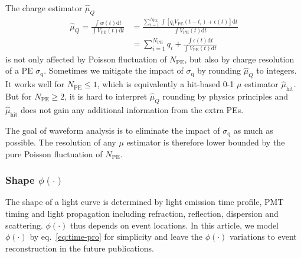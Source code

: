 The charge estimator $\hat{\mu}_Q$
\begin{equation}
  \begin{aligned}
  \label{eq:mu-q}
  \hat{\mu}_Q = \frac{\int w(t) \mathrm{d} t}{\int V_\mathrm{PE}(t) \mathrm{d} t} &= \frac{\sum_{i=1}^{N_\mathrm{PE}} \int \left[ q_i V_\mathrm{PE}(t-t_i) + \epsilon(t) \right] \mathrm{d} t}{\int V_\mathrm{PE}(t) \mathrm{d} t} \\
  & = \sum_{i=1}^{N_\mathrm{PE}} q_i + \frac{\int \epsilon(t) \mathrm{d} t}{\int V_\mathrm{PE}(t) \mathrm{d} t}
  \end{aligned}
\end{equation}
is not only affected by Poisson fluctuation of $N_\mathrm{PE}$, but also by charge resolution of a PE $\sigma_\mathrm{q}$.  Sometimes we mitigate the impact of $\sigma_\mathrm{q}$ by rounding $\hat{\mu}_Q$ to integers.  It works well for $N_\mathrm{PE} \le 1$, which is equivalently a hit-based 0-1 $\mu$ estimator $\hat{\mu}_\mathrm{hit}$.  But for $N_\mathrm{PE} \ge 2$, it is hard to interpret $\hat{\mu}_Q$ rounding by physics principles and $\hat{\mu}_\mathrm{hit}$ does not gain any additional information from the extra PEs.

The goal of waveform analysis is to eliminate the impact of $\sigma_\mathrm{q}$ as much as possible.  The resolution of any $\mu$ estimator is therefore lower bounded by the pure Poisson fluctuation of $N_\mathrm{PE}$.

\subsubsection{Shape $\phi(\cdot)$}
\label{sec:shape-phicdot}

The shape of a light curve is determined by light emission time profile, PMT timing and light propagation including refraction, reflection, dispersion and scattering.  $\phi(\cdot)$ thus depends on event locations.  In this article, we model $\phi(\cdot)$ by eq.~\eqref{eq:time-pro} for simplicity and leave the $\phi(\cdot)$ variations to event reconstruction in the future publications.